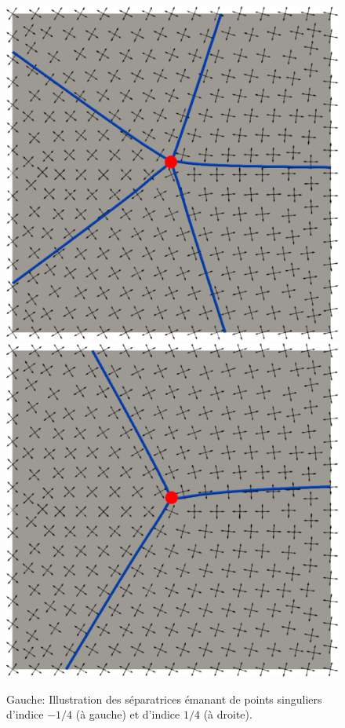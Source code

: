 \begin{figure}[!h]
  \centering
  \includegraphics[scale=0.282]{images/sepa_5.pdf}
  \hfill
  \includegraphics[scale=0.282]{images/sepa_3.pdf}
  \caption{Gauche: Illustration des séparatrices émanant de points singuliers d'indice $-1/4$ (à gauche) et d'indice $1/4$ (à droite).}
  \label{fig:separatrice_illustration}
\end{figure}

